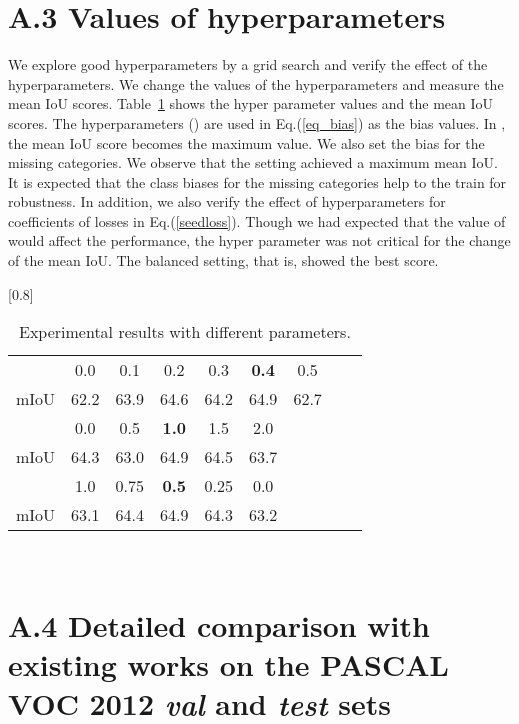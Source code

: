 \documentclass[10pt,twocolumn,letterpaper]{article}
\begin{document}
\section*{A.3 Values of hyperparameters}

We explore good hyperparameters by a grid search and verify the effect of the hyperparameters.
We change the values of the hyperparameters and measure the mean IoU scores.
Table~\ref{hp} shows the hyper parameter values and the mean IoU scores.
The hyperparameters () are used in Eq.(\ref{eq_bias}) as the bias values.
In , the mean IoU score becomes the maximum value.
We also set the bias  for the missing categories.
We observe that the setting  achieved a maximum mean IoU.
It is expected that the class biases for the missing categories help to the train for robustness.
In addition, we also verify the effect of hyperparameters for coefficients of losses in Eq.(\ref{seedloss}).
Though we had expected that the value of  would affect the performance, the hyper parameter was not critical for the change of the mean IoU.
The balanced setting, that is,  showed the best score.

\begin{table}[hb]
  \begin{center}
\caption{Experimental results with different parameters. \label{hp}}
\scalebox{0.8}[0.8]{
  \begin{tabular}{c|cccccccc}
     \hline
      & 0.0 & 0.1 & 0.2 & 0.3 & \textbf{0.4} & 0.5  \\mIoU & 62.2 & 63.9 & 64.6 & 64.2 & 64.9 & 62.7  \\\hline
      & 0.0 & 0.5 & \textbf{1.0} & 1.5 & 2.0 \\ mIoU & 64.3 & 63.0 & 64.9 & 64.5 & 63.7  \\\hline
      & 1.0 & 0.75 & \textbf{0.5} & 0.25&0.0  \\ mIoU & 63.1 & 64.4 & 64.9 & 64.3  & 63.2  \\\hline
  \end{tabular}
}
\vskip -8mm~
\end{center}
\end{table}

\newpage
\section*{A.4 Detailed comparison with existing works on the PASCAL VOC 2012 {\it val} and {\it test} sets}
\end{document}
